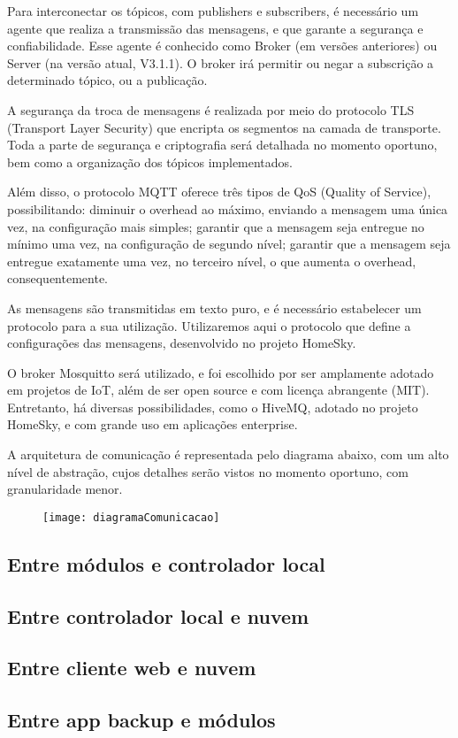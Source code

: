 Para interconectar os tópicos, com publishers e subscribers, é necessário um agente que realiza a transmissão das mensagens, e que garante a segurança e confiabilidade. Esse agente é conhecido como Broker (em versões anteriores) ou Server (na versão atual, V3.1.1). O broker irá permitir ou negar a subscrição a determinado tópico, ou a publicação.

A segurança da troca de mensagens é realizada por meio do protocolo TLS (Transport Layer Security) que encripta os segmentos na camada de transporte. Toda a parte de segurança e criptografia será detalhada no momento oportuno, bem como a organização dos tópicos implementados.

Além disso, o protocolo MQTT oferece três tipos de QoS (Quality of Service), possibilitando: diminuir o overhead ao máximo, enviando a mensagem uma única vez, na configuração mais simples; garantir que a mensagem seja entregue no mínimo uma vez, na configuração de segundo nível; garantir que a mensagem seja entregue exatamente uma vez, no terceiro nível, o que aumenta o overhead, consequentemente.

As mensagens são transmitidas em texto puro, e é necessário estabelecer um protocolo para a sua utilização. Utilizaremos aqui o protocolo que define a configurações das mensagens, desenvolvido no projeto HomeSky.

O broker Mosquitto será utilizado, e foi escolhido por ser amplamente adotado em projetos de IoT, além de ser open source e com licença abrangente (MIT). Entretanto, há diversas possibilidades, como o HiveMQ, adotado no projeto HomeSky, e com grande uso em aplicações enterprise.

A arquitetura de comunicação é representada pelo diagrama abaixo, com um alto nível de abstração, cujos detalhes serão vistos no momento oportuno, com granularidade menor.

\begin{figure}[H]
	\centering
	\caption{}
  \texttt{[image: diagramaComunicacao]}
\label{fig:diagramaComunicacao}
\end{figure}

\subsection{Entre módulos e controlador local}
\subsection{Entre controlador local e nuvem}
\subsection{Entre cliente web e nuvem}
\subsection{Entre app backup e módulos}
